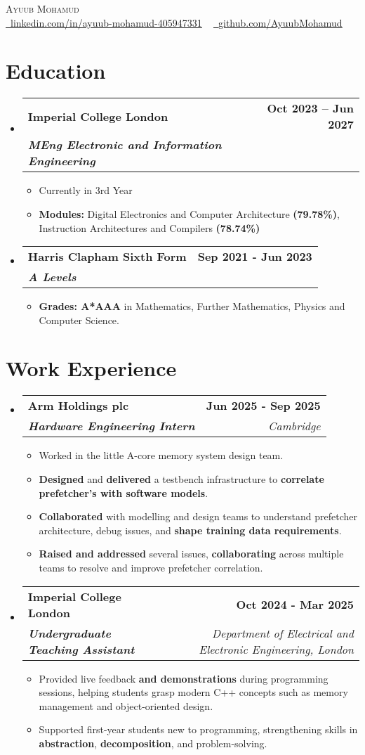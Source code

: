 \documentclass[a4paper,11pt]{article}
\makeatletter
\newcommand{\resumeItem}[1]{
  \item\small{
    {#1 \vspace{-2pt}}
  }
}
\newcommand{\resumeSubheading}[4]{
  \vspace{-2pt}\item
    \begin{tabular*}{1.0\textwidth}[t]{l@{\extracolsep{\fill}}r}
      \textbf{#1} & \textbf{\small #2} \\
      \textbf{\textit{\small #3}} & \textit{\small #4} \\
    \end{tabular*}\vspace{-9pt}
}
\newcommand{\resumeSubHeadingListStart}{\begin{itemize}[leftmargin=0.0in, label={}] \setlength{\itemsep}{-7pt}}
\newcommand{\resumeSubHeadingListEnd}{\end{itemize}}
\newcommand{\resumeSubHeadingWorkListStart}{\begin{itemize}[leftmargin=0.0in, label={}]}
\newcommand{\resumeSubHeadingWorkListEnd}{\end{itemize}}
\newcommand{\resumeItemListStart}{\begin{itemize}}
\newcommand{\resumeItemListEnd}{\end{itemize}\vspace{-8pt}}
\makeatother
\begin{document}
\begin{center}
    \vspace*{-0.3in}
    {\Huge \scshape Ayuub Mohamud} \\ \vspace{3pt}
    \href{https://www.linkedin.com/in/ayuub-mohamud-405947331/}{\raisebox{-0.2\height}\faLinkedin\ \underline{linkedin.com/in/ayuub-mohamud-405947331}} ~
    \href{https://github.com/AyuubMohamud}{\raisebox{-0.2\height}\faGithub\ \underline{github.com/AyuubMohamud}}
    \vspace{-8pt}
\end{center}


\section{Education}
\resumeSubHeadingListStart
\resumeSubheading
{Imperial College London}{Oct 2023 -- Jun 2027}
{MEng Electronic and Information Engineering}{}
\resumeItemListStart
\resumeItem{Currently in 3rd Year}
\resumeItem{\textbf{Modules:} Digital Electronics and Computer Architecture \textbf{(79.78\%)}, Instruction Architectures and Compilers \textbf{(78.74\%)} }
\resumeItemListEnd
\vspace{4mm} %
\resumeSubheading
{Harris Clapham Sixth Form}{Sep 2021 - Jun 2023}
{A Levels}{}
\resumeItemListStart
\resumeItem{\textbf{Grades: A*AAA }in Mathematics, Further Mathematics, Physics and Computer Science.}
\resumeItemListEnd
\resumeSubHeadingListEnd
\section{Work Experience}
\resumeSubHeadingWorkListStart
\resumeSubheading
{Arm Holdings plc}{Jun 2025 - Sep 2025}
{Hardware Engineering Intern}{Cambridge}
\resumeItemListStart
\resumeItem{Worked in the little A-core memory system design team.}
\resumeItem{\textbf{Designed} and \textbf{delivered} a testbench infrastructure to \textbf{correlate prefetcher's with software models}.}
\resumeItem{\textbf{Collaborated} with modelling and design teams to understand prefetcher architecture, debug issues, and \textbf{shape training data requirements}.}
\resumeItem{\textbf{Raised and addressed} several issues, \textbf{collaborating} across multiple teams to resolve and improve prefetcher correlation.}
\resumeItemListEnd
\resumeSubheading
{Imperial College London}{Oct 2024 - Mar 2025}
{Undergraduate Teaching Assistant}{Department of Electrical and Electronic Engineering, London}
\resumeItemListStart
\resumeItem{Provided live feedback \textbf{and demonstrations} during programming sessions, helping students grasp modern C++ concepts such as memory management and object-oriented design.}
\resumeItem{Supported first-year students new to programming, strengthening skills in \textbf{abstraction}, \textbf{decomposition}, and problem-solving.}
\resumeItemListEnd
\resumeSubHeadingWorkListEnd
\end{document}
